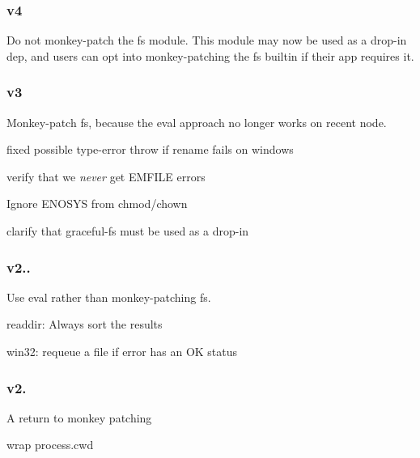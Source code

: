\subsubsection*{v4}


\begin{DoxyItemize}
\item Do not monkey-\/patch the fs module. This module may now be used as a drop-\/in dep, and users can opt into monkey-\/patching the fs builtin if their app requires it.
\end{DoxyItemize}

\subsubsection*{v3}


\begin{DoxyItemize}
\item Monkey-\/patch fs, because the eval approach no longer works on recent node.
\item fixed possible type-\/error throw if rename fails on windows
\item verify that we {\itshape never} get E\+M\+F\+I\+LE errors
\item Ignore E\+N\+O\+S\+YS from chmod/chown
\item clarify that graceful-\/fs must be used as a drop-\/in
\end{DoxyItemize}

\subsubsection*{v2..}


\begin{DoxyItemize}
\item Use eval rather than monkey-\/patching fs.
\item readdir\+: Always sort the results
\item win32\+: requeue a file if error has an OK status
\end{DoxyItemize}

\subsubsection*{v2.}


\begin{DoxyItemize}
\item A return to monkey patching
\item wrap process.\+cwd
\end{DoxyItemize}

